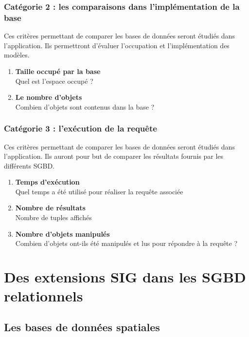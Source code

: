\subsubsection{Catégorie 2 : les comparaisons dans l'implémentation de la base}
Ces critères permettant de comparer les bases de données seront étudiés dans l'application. Ils permettront d'évaluer l'occupation et l'implémentation des modèles.
\begin{enumerate}
    \item \textbf{Taille occupé par la base} \\ Quel est l'espace occupé ? \newline
    \item \textbf{Le nombre d'objets} \\ Combien d'objets sont contenus dans la base ? \newline
\end{enumerate}


\subsubsection{Catégorie 3 : l'exécution de la requête}
Ces critères permettant de comparer les bases de données seront étudiés dans l'application. Ils auront pour but de comparer les résultats fournis par les différents SGBD.
\begin{enumerate}
    \item \textbf{Temps d'exécution} \\ Quel temps a été utilisé pour réaliser la requête associée \newline
    \item \textbf{Nombre de résultats} \\ Nombre de tuples affichés \newline
    \item \textbf{Nombre d'objets manipulés} \\ Combien d'objets ont-ils été manipulés et lus pour répondre à la requête ?
\end{enumerate}



\section{Des extensions SIG dans les SGBD relationnels}

\subsection{Les bases de données spatiales}

